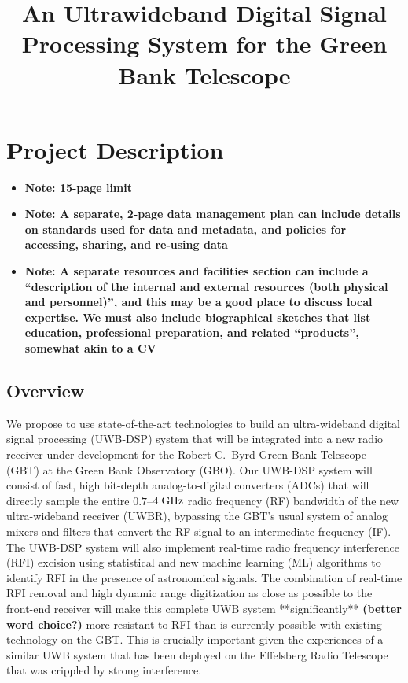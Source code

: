 \documentclass[10pt]{myNSF}
\begin{document}
\title{An Ultrawideband Digital Signal Processing System for the Green
  Bank Telescope}
\maketitle

\section{Project Description}
\label{sec:project_description}

\begin{itemize}
\item{\textbf{Note: 15-page limit}}
\item{\textbf{Note: A separate, 2-page data management plan can
      include details on standards used for data and metadata, and
      policies for accessing, sharing, and re-using data}}
\item{\textbf{Note: A separate resources and facilities section can
      include a ``description of the internal and external resources
      (both physical and personnel)'', and this may be a good place to
      discuss local expertise.  We must also include biographical
      sketches that list education, professional preparation, and
      related ``products'', somewhat akin to a CV}}
\end{itemize}

\subsection{Overview}
\label{sec:overview}

We propose to use state-of-the-art technologies to build an
ultra-wideband digital signal processing (UWB-DSP) system that will be
integrated into a new radio receiver under development for the Robert
C.\ Byrd Green Bank Telescope (GBT) at the Green Bank Observatory
(GBO).  Our UWB-DSP system will consist of fast, high bit-depth
analog-to-digital converters (ADCs) that will directly sample the
entire $0.7$--$4\; \textrm{GHz}$ radio frequency (RF) bandwidth of the new
ultra-wideband receiver (UWBR), bypassing the GBT's usual system of
analog mixers and filters that convert the RF signal to an
intermediate frequency (IF).  The UWB-DSP system will also implement
real-time radio frequency interference (RFI) excision using
statistical and new machine learning (ML) algorithms to identify RFI
in the presence of astronomical signals.  The combination of real-time
RFI removal and high dynamic range digitization as close as possible
to the front-end receiver will make this complete UWB system
**significantly** \textbf{(better word choice?)} more resistant to RFI
than is currently possible with existing technology on the GBT.  This
is crucially important given the experiences of a similar UWB system
that has been deployed on the Effelsberg Radio Telescope that was
crippled by strong interference.
\end{document}
